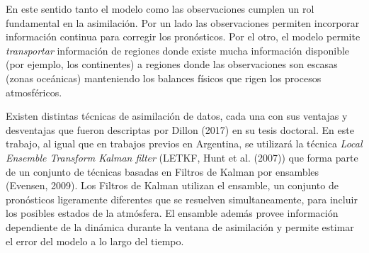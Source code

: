 \documentclass[12pt,oneside,a4paper]{reedthesis}
\begin{document}
En este sentido tanto el modelo como las observaciones cumplen un rol fundamental en la asimilación. Por un lado las observaciones permiten incorporar información continua para corregir los pronósticos. Por el otro, el modelo permite \emph{transportar} información de regiones donde existe mucha información disponible (por ejemplo, los continentes) a regiones donde las observaciones son escasas (zonas oceánicas) manteniendo los balances físicos que rigen los procesos atmosféricos.

Existen distintas técnicas de asimilación de datos, cada una con sus ventajas y desventajas que fueron descriptas por Dillon (2017) en su tesis doctoral. En este trabajo, al igual que en trabajos previos en Argentina, se utilizará la técnica \emph{Local Ensemble Transform Kalman filter} (LETKF, Hunt et al. (2007)) que forma parte de un conjunto de técnicas basadas en Filtros de Kalman por ensambles (Evensen, 2009). Los Filtros de Kalman utilizan el ensamble, un conjunto de pronósticos ligeramente diferentes que se resuelven simultaneamente, para incluir los posibles estados de la atmósfera. El ensamble además provee información dependiente de la dinámica durante la ventana de asimilación y permite estimar el error del modelo a lo largo del tiempo.
\end{document}
